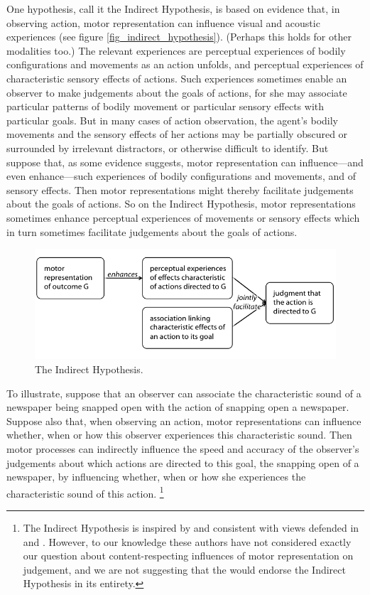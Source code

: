 \documentclass[12pt,\papersize]{extarticle}
\begin{document}
One hypothesis, call it the Indirect Hypothesis, is based on evidence that, in observing action, motor representation can influence visual and acoustic experiences (see figure \vref{fig_indirect_hypothesis}). (Perhaps this holds for other modalities too.) The relevant experiences are perceptual experiences of bodily configurations and movements as an action unfolds, and perceptual experiences of characteristic sensory effects of actions.  Such experiences sometimes enable an observer to make judgements about the goals of actions, for she may associate particular patterns of bodily movement or particular sensory effects with particular goals.  But in many cases of action observation, the agent's bodily movements and the sensory effects of her actions may be partially obscured or surrounded by irrelevant distractors, or otherwise difficult to identify.  But suppose that, as some evidence suggests, motor representation can influence---and even enhance---such experiences of bodily configurations and movements, and of sensory effects.  Then motor representations might thereby facilitate judgements about the goals of actions.  So on the Indirect Hypothesis, motor representations sometimes enhance perceptual experiences of movements or sensory effects which in turn sometimes facilitate judgements about the goals of actions.   

\begin{figure}
\begin{center}
\includegraphics[width=\textwidth]{fig_indirect_hypothesis.png}
\caption{
\label{fig_indirect_hypothesis}
	The Indirect Hypothesis.
}
\end{center}
\end{figure}


To illustrate, suppose that an observer can associate the characteristic sound of a newspaper being snapped open with the action of snapping open a newspaper. Suppose also that, when observing an action, motor  representations can influence whether, when or how this observer experiences this characteristic sound.  Then motor processes can indirectly influence the speed and accuracy of the observer's judgements about which actions are directed to this goal, the snapping open of a newspaper, by influencing whether, when or how she experiences the characteristic sound of this action.%
\footnote{
The Indirect Hypothesis is inspired by and consistent with views defended in \citet{Csibra:2007fy} and \citet{Wilson:2005qu}.  However, to our knowledge these authors have not considered exactly our question about content-respecting influences of motor representation on judgement, and we are not suggesting that the would endorse the Indirect Hypothesis in its entirety.  
}
\end{document}
